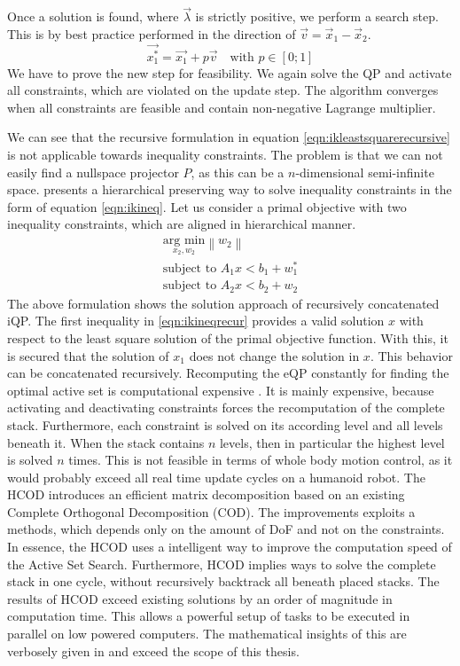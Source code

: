 Once a solution is found, where $\vec{\lambda}$ is strictly positive, we perform a search step. This is by best practice performed in the direction of $\vec{v} = \vec{x}_1-\vec{x}_2$. 
\begin{equation*}
\vec{x^*_1} = \vec{x_1}+ p\vec{v} \quad \text{with } p \in [0;1]
\end{equation*}
We have to prove the new step for feasibility. We again solve the QP and activate all constraints, which are violated on the update step. The algorithm converges when all constraints are feasible and contain non-negative Lagrange multiplier.

We can see that the recursive formulation in equation \ref{eqn:ikleastsquarerecursive} is not applicable towards inequality constraints. The problem is that we can not easily find a nullspace projector $P$, as this can be a $n$-dimensional semi-infinite space. \cite{kanoun:itro:11} presents a hierarchical preserving way to solve inequality constraints in the form of equation \ref{eqn:ikineq}. Let us consider a primal objective with two inequality constraints, which are aligned in hierarchical manner.
\begin{eqnarray} \label{eqn:ikineqrecur}
\underset{x_2,w_2}{\text{arg min}} \left\| w_2 \right \| \\
\text{subject to } A_1 x < b_1 + w_1^* \\
\text{subject to } A_2 x < b_2 + w_2
\end{eqnarray}
The above formulation shows the solution approach of recursively concatenated iQP. The first inequality in \ref{eqn:ikineqrecur} provides a valid solution $x$ with respect to the least square solution of the primal objective function. With this, it is secured that the solution of $x_1$ does not change the solution in $x$. This behavior can be concatenated recursively.
\newpage
Recomputing the eQP constantly for finding the optimal active set is computational expensive \cite{escande-icra-10}. It is mainly expensive, because activating and deactivating constraints forces the recomputation of the complete stack. Furthermore, each constraint is solved on its according level and all levels beneath it. When the stack contains $n$ levels, then in particular the highest level is solved $n$ times. This is not feasible in terms of whole body motion control, as it would probably exceed all real time update cycles on a humanoid robot. The HCOD introduces an efficient matrix decomposition based on an existing Complete Orthogonal Decomposition (COD). The improvements exploits a methods, which depends only on the amount of DoF and not on the constraints. In essence, the HCOD uses a intelligent way to improve the computation speed of the Active Set Search. Furthermore, HCOD implies ways to solve the complete stack in one cycle, without recursively backtrack all beneath placed stacks. The results of HCOD exceed existing solutions by an order of magnitude in computation time. This allows a powerful setup of tasks to be executed in parallel on low powered computers. The mathematical insights of this are verbosely given in \cite{escande-ijrr-sub12} and exceed the scope of this thesis.